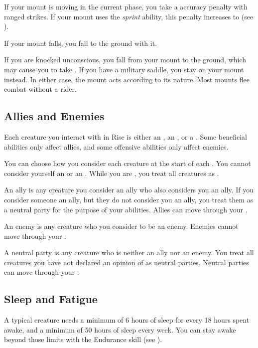             If your mount is moving in the current phase, you take a  accuracy penalty with ranged strikes.
            If your mount uses the \textit{sprint} ability, this penalty increases to  (see ).

             If your mount falls, you fall to the ground with it.

             If you are knocked unconscious, you fall from your mount to the ground, which may cause you to take .
            If you have a military saddle, you stay on your mount instead.
            In either case, the mount acts according to its nature.
            Most mounts flee combat without a rider.

    \subsection{Allies and Enemies}\label{Allies and Enemies}
        Each creature you interact with in Rise is either an , an , or a .
        Some beneficial abilities only affect allies, and some offensive abilities only affect enemies.

        You can choose how you consider each creature at the start of each .
        You cannot consider yourself an  or an .
        While you are \unconscious, you treat all creatures as .

         An ally is any creature you consider an ally who also considers you an ally.
        If you consider someone an ally, but they do not consider you an ally, you treat them as a neutral party for the purpose of your abilities.
        Allies can move through your .

         An enemy is any creature who you consider to be an enemy.
        Enemies cannot move through your .

         A neutral party is any creature who is neither an ally nor an enemy.
        You treat all creatures you have not declared an opinion of as neutral parties.
        Neutral parties can move through your .

    \subsection{Sleep and Fatigue}\label{Sleep and Fatigue}
        A typical creature needs a minimum of 6 hours of sleep for every 18 hours spent awake, and a minimum of 50 hours of sleep every week.
        You can stay awake beyond those limits with the Endurance skill (see ).

